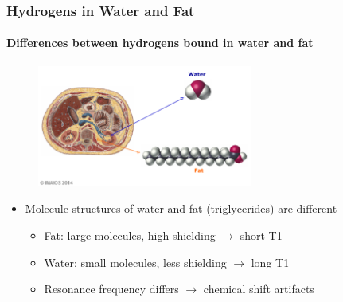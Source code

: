 \begin{frame}
	\frametitle{Hydrogens in Water and Fat}
	\framesubtitle{Differences between hydrogens bound in water and fat}

\begin{figure}%
\includegraphics[height=4cm]{images/hydrogen_in_water_fat.png}%
\end{figure}
%
\begin{itemize}
		\item Molecule structures of water and fat (triglycerides) are different
			\begin{itemize}
			\item Fat: large molecules, high shielding $\rightarrow$ short T1
			\item Water: small molecules, less shielding $\rightarrow$ long T1
			\item Resonance frequency differs $\rightarrow$ chemical shift artifacts
			\end{itemize}
	\end{itemize}
\end{frame}

